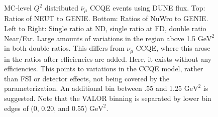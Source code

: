 \documentclass[12pt]{article}
\begin{document}
\begin{figure}[h]
\endminipage
\caption{MC-level $Q^2$ distributed $\overline{\nu}_{\mu}$ CCQE events using DUNE flux. Top: Ratios of NEUT to GENIE. Bottom: Ratios of NuWro to GENIE. Left to Right: Single ratio at ND, single ratio at FD, double ratio Near/Far. Large amounts of variations in the region above 1.5 $\textrm{GeV}^2$ in both double ratios. This differs from $\nu_{\mu}$ CCQE, where this arose in the ratios after efficiencies are added. Here, it exists without any efficiencies. This points to variations in the CCQE model, rather than FSI or detector effects, not being covered by the parameterization. An additional bin between .55 and 1.25 $\textrm{GeV}^2$ is suggested. Note that the VALOR binning is separated by lower bin edges of (0, 0.20, and 0.55) $\textrm{GeV}^2$.}
\label{fig:Q2_ccqe_bar}
\end{figure}
\FloatBarrier
\end{document}

